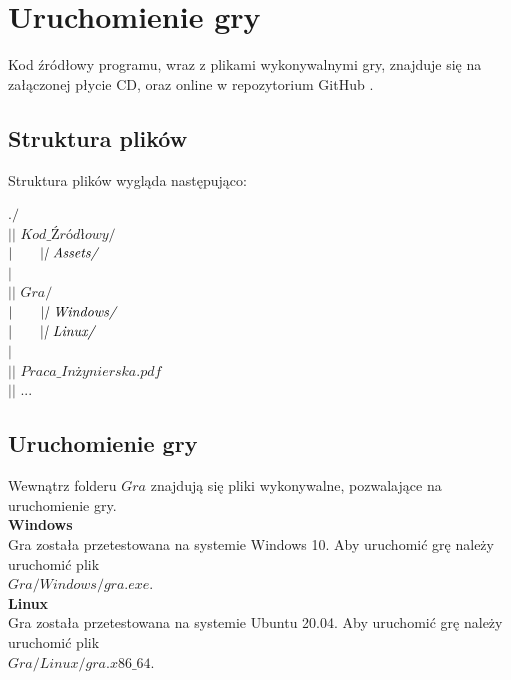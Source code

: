 \chapter{Uruchomienie gry}
\thispagestyle{chapterBeginStyle}

Kod źródłowy programu, wraz z plikami wykonywalnymi gry, znajduje się na załączonej płycie CD, oraz online w repozytorium GitHub \cite{Github}.

\section{Struktura plików}
Struktura plików wygląda następująco:\\
\begin{algorithm}[H]
    $./$\\
    $|\textit{| Kod\_Źródłowy/}$\\
    $|\hskip2em |\textit{| Assets/}$\\
    $|$\\
    $|\textit{| Gra/}$\\
    $|\hskip2em |\textit{| Windows/}$\\
    $|\hskip2em |\textit{| Linux/}$\\
    $|$\\
    $|\textit{| Praca\_Inżynierska.pdf}$\\
    $|\textit{| ...}$\\
\end{algorithm}

\section{Uruchomienie gry}
    Wewnątrz folderu $Gra$ znajdują się pliki wykonywalne, pozwalające na uruchomienie gry.\\
    \textbf{Windows}\\
    Gra została przetestowana na systemie Windows 10. Aby uruchomić grę należy uruchomić plik\\
    $Gra/Windows/gra.exe$.\\
    \textbf{Linux}\\
    Gra została przetestowana na systemie Ubuntu 20.04. Aby uruchomić grę należy uruchomić plik\\
    $Gra/Linux/gra.x86\_64$.\\

